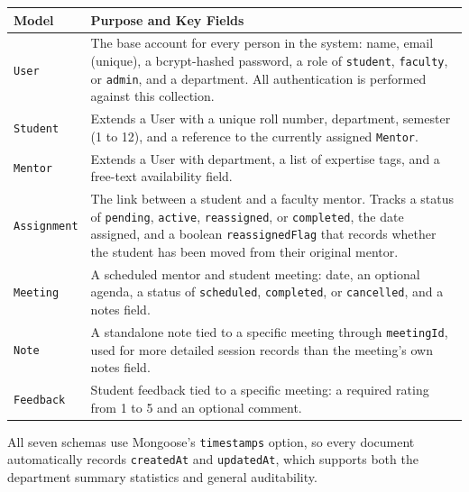 \documentclass[12pt,a4paper]{report}
\begin{document}
\begin{longtable}{@{}p{2.6cm}p{11cm}@{}}
\toprule
\textbf{Model} & \textbf{Purpose and Key Fields} \\
\midrule
\endhead
\texttt{User} & The base account for every person in the system: name, email (unique), a bcrypt-hashed password, a role of \texttt{student}, \texttt{faculty}, or \texttt{admin}, and a department. All authentication is performed against this collection. \\
\texttt{Student} & Extends a User with a unique roll number, department, semester (1 to 12), and a reference to the currently assigned \texttt{Mentor}. \\
\texttt{Mentor} & Extends a User with department, a list of expertise tags, and a free-text availability field. \\
\texttt{Assignment} & The link between a student and a faculty mentor. Tracks a status of \texttt{pending}, \texttt{active}, \texttt{reassigned}, or \texttt{completed}, the date assigned, and a boolean \texttt{reassignedFlag} that records whether the student has been moved from their original mentor. \\
\texttt{Meeting} & A scheduled mentor and student meeting: date, an optional agenda, a status of \texttt{scheduled}, \texttt{completed}, or \texttt{cancelled}, and a notes field. \\
\texttt{Note} & A standalone note tied to a specific meeting through \texttt{meetingId}, used for more detailed session records than the meeting's own notes field. \\
\texttt{Feedback} & Student feedback tied to a specific meeting: a required rating from 1 to 5 and an optional comment. \\
\bottomrule
\end{longtable}

All seven schemas use Mongoose's \texttt{timestamps} option, so every document automatically records \texttt{createdAt} and \texttt{updatedAt}, which supports both the department summary statistics and general auditability.
\end{document}
